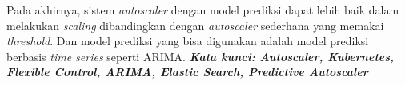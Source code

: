 \begin{singlespace}
    Pada akhirnya, sistem \textit{autoscaler} dengan model prediksi dapat lebih baik dalam melakukan \textit{scaling} dibandingkan dengan \textit{autoscaler} sederhana yang memakai \textit{threshold}. Dan model prediksi yang bisa digunakan adalah model prediksi berbasis \textit{time series} seperti ARIMA.
    \textbf{\textit{Kata kunci: Autoscaler, Kubernetes, Flexible Control, ARIMA, Elastic Search, Predictive Autoscaler}}
\end{singlespace}
\clearpage